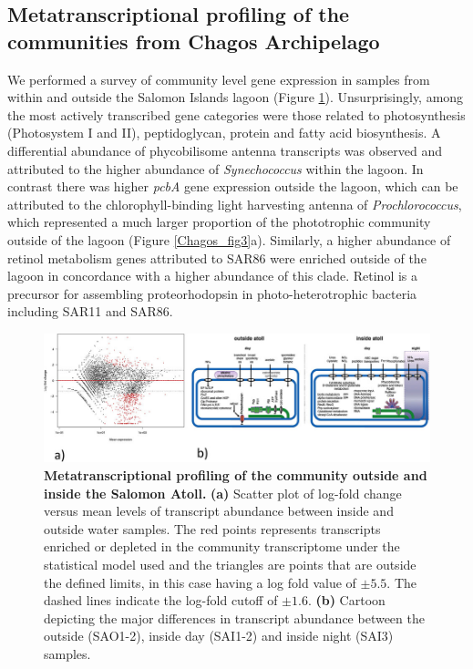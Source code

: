 \subsection{Metatranscriptional profiling of the communities from Chagos Archipelago}

We performed a survey of community level gene expression in samples from within and outside the Salomon Islands lagoon (Figure \ref{Chagos_fig4}). Unsurprisingly, among the most actively transcribed gene categories were those related to photosynthesis (Photosystem I and II), peptidoglycan, protein and fatty acid biosynthesis. A differential abundance of phycobilisome antenna transcripts was observed and attributed to the higher abundance of {\em Synechococcus} within the lagoon. In contrast there was higher {\em pcbA} gene expression outside the lagoon, which can be attributed to the chlorophyll-binding light harvesting antenna of {\em Prochlorococcus}, which represented a much larger proportion of the phototrophic community outside of the lagoon (Figure \ref{Chagos_fig3}a). Similarly, a higher abundance of retinol metabolism genes attributed to SAR86 were enriched outside of the lagoon in concordance with a higher abundance of this clade. \cite{dupont_genomic_2012} Retinol is a precursor for assembling proteorhodopsin in photo-heterotrophic bacteria \cite{delong_light-driven_2010} including SAR11 and SAR86.

\begin{figure}
    \centering
    \includegraphics[width=\textwidth]{Chagos/figures/fig4}
    \caption{\textbf{Metatranscriptional profiling of the community outside and inside the Salomon Atoll.} \textbf{(a)} Scatter plot of log-fold change versus mean levels of transcript abundance between inside and outside water samples. The red points represents transcripts enriched or depleted in the community transcriptome under the statistical model used and the triangles are points that are outside the defined limits, in this case having a log fold value of $\pm 5.5$. The dashed lines indicate the log-fold cutoff of $\pm 1.6$. \textbf{(b)} Cartoon depicting the major differences in transcript abundance between the outside (SAO1-2), inside day (SAI1-2) and inside night (SAI3) samples.}
    \label{Chagos_fig4}
\end{figure}

